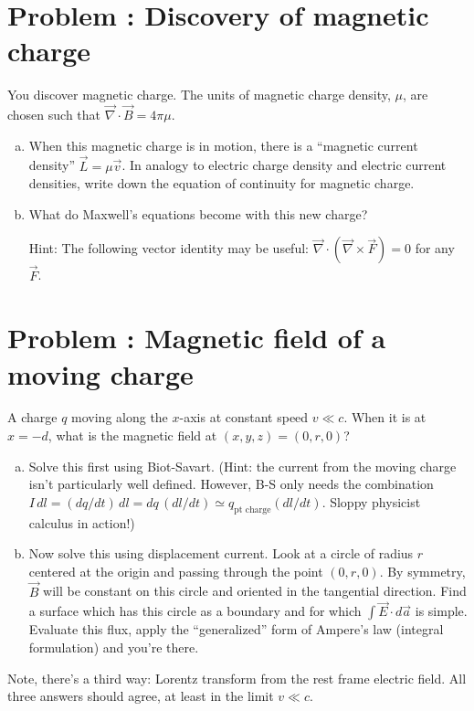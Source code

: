 \documentclass[problems]{esg8022pset}
\date{\today }
\begin{document}
\section{Problem \thesection: Discovery of magnetic charge}
  You discover magnetic charge.  The units of magnetic charge density,
  $\mu$, are chosen such that $\vec\nabla\cdot\vec B = 4\pi\mu$.

  \begin{enumerate}[(a)]
    \item When this magnetic charge is in motion,
      there is a ``magnetic current density'' $\vec{L} = \mu \vec{v}$.  In
      analogy to electric charge density and electric current densities,
      write down the equation of continuity for magnetic charge.
    \item What do Maxwell's equations become with this
      new charge? \par\noindent
      Hint: The following vector identity may be useful: $\vec\nabla\cdot(\vec{\nabla}\times\vec{F}) = 0$ for any $\vec{F}$.
  \end{enumerate}
\section{Problem \thesection: Magnetic field of a moving charge}
  A charge $q$ moving
  along the $x$-axis at constant speed $v \ll c$.  When it is at $x =
  -d$, what is the magnetic field at $(x,y,z) = (0,r,0)$?

  \begin{enumerate}[(a)]
    \item Solve this first using Biot-Savart.  (Hint:
      the current from the moving charge isn't particularly well defined.
      However, B-S only needs the combination $I\,dl = (dq/dt)\,dl = dq\,
      (dl/dt) \simeq q_{\text{pt charge}}(dl/dt)$.  Sloppy physicist calculus
      in action!)
    \item Now solve this using displacement current.
      Look at a circle of radius $r$ centered at the origin and passing
      through the point $(0,r,0)$.  By symmetry, $\vec B$ will be constant
      on this circle and oriented in the tangential direction.  Find a
      surface which has this circle as a boundary and for which $\int \vec
      E\cdot d\vec a$ is simple.  Evaluate this flux, apply the
      ``generalized'' form of Ampere's law (integral formulation) and you're
      there.
  \end{enumerate}

  \noindent Note, there's a third way: Lorentz transform from the
  rest frame electric field.  All
  three answers should agree, at least in the limit $v \ll c$.
  \clearpage
\end{document}
